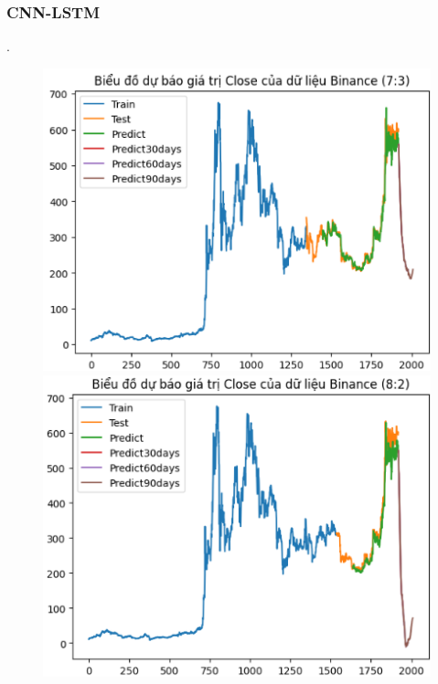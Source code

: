 \documentclass[conference]{IEEEtran}
\begin{document}
	\subsubsection{CNN-LSTM}.
	\begin{figure}[H]
		\centering
		\begin{minipage}{0.15\textwidth}
			\centering
			\includegraphics[width=1\textwidth]{Figure/BNB73.png}
		\end{minipage}
		\hfill
		\begin{minipage}{0.15\textwidth}
			\centering
			\includegraphics[width=1\textwidth]{Figure/BNB82.png}
		\end{minipage}

\end{figure}
\end{document}
